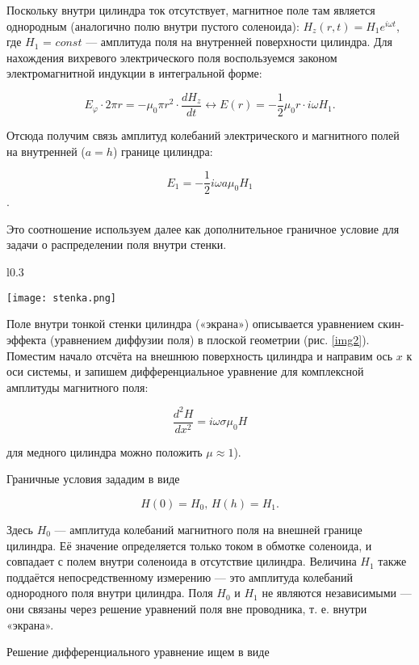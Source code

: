 \documentclass[a4paper,12pt]{article} %
\begin{document}
Поскольку внутри цилиндра ток отсутствует, магнитное поле там является однородным
(аналогично полю внутри пустого соленоида): $H_z(r, t) = H_1e^{i\omega t}$, где $H_1$ = $const$ — амплитуда поля на внутренней поверхности цилиндра. Для нахождения вихревого электрического поля воспользуемся законом электромагнитной индукции в интегральной форме:

\[ E_{\varphi} \cdot 2 \pi r = - \mu_0 \pi r^2 \cdot \frac{dH_z}{dt} \longleftrightarrow E(r) = - \frac{1}{2} \mu_0 r \cdot i \omega H_1. \]

Отсюда получим связь амплитуд колебаний электрического и магнитного полей на внутренней ($a = h$) границе цилиндра:

\[ E_1 = - \frac{1}{2} i \omega a \mu_0 H_1 \].

Это соотношение используем далее как дополнительное граничное условие для задачи о
распределении поля внутри стенки.

\begin{wrapfigure}[24]{l}{0.3\textwidth}
    \begin{center}
    \texttt{[image: stenka.png]}
\end{center}
\caption{Поле в стенке циллиндра}
\label{img2}
\end{wrapfigure}

Поле внутри тонкой стенки цилиндра («экрана») описывается уравнением скин-эффекта (уравнением диффузии поля) в плоской геометрии (рис. \ref{img2}). Поместим начало отсчёта на внешнюю поверхность цилиндра и направим ось $x$ к оси системы, и запишем дифференциальное уравнение для комплексной амплитуды магнитного поля:

\[ \frac{d^2H}{dx^2} = i \omega \sigma \mu_0 H \]

для медного цилиндра можно положить $\mu \approx 1$).

Граничные условия зададим в виде

\[ H(0) = H_0 \text{, } H(h) = H_1. \]

Здесь $H_0$ — амплитуда колебаний магнитного поля на внешней границе цилиндра. Её значение определяется только током в обмотке соленоида, и совпадает с полем внутри соленоида в отсутствие цилиндра. Величина $H_1$ также поддаётся непосредственному измерению — это амплитуда колебаний однородного поля внутри цилиндра. Поля $H_0$
и $H_1$ не являются независимыми — они связаны через решение уравнений поля вне проводника, т. е. внутри «экрана».

Решение дифференциального уравнение ищем в виде
\end{document}
